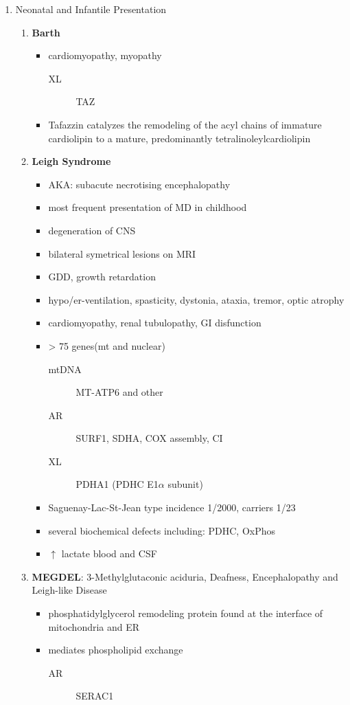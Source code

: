 \documentclass[12pt]{scrartcl}
\begin{document}
\begin{enumerate}
\item Neonatal and Infantile Presentation
\label{sec:orgd7a649c}
\begin{enumerate}
\item \textbf{Barth}
\label{sec:org1db8224}
\begin{itemize}
\item cardiomyopathy, myopathy
\begin{description}
\item[{XL}] TAZ
\end{description}
\item Tafazzin catalyzes the remodeling of the acyl chains of immature
cardiolipin to a mature, predominantly tetralinoleylcardiolipin
\end{itemize}
\item \textbf{Leigh Syndrome}
\label{sec:orgfb7a59c}
\begin{itemize}
\item AKA: subacute necrotising encephalopathy
\item most frequent presentation of MD in childhood
\item degeneration of CNS
\item bilateral symetrical lesions on MRI
\item GDD, growth retardation
\item hypo/er-ventilation, spasticity, dystonia, ataxia, tremor, optic atrophy
\item cardiomyopathy, renal tubulopathy, GI disfunction
\item \textgreater{} 75 genes(mt and nuclear)
\begin{description}
\item[{mtDNA}] MT-ATP6 and other
\item[{AR}] SURF1, SDHA, COX assembly, CI
\item[{XL}] PDHA1 (PDHC E1\(\alpha\) subunit)
\end{description}
\item Saguenay-Lac-St-Jean type incidence 1/2000, carriers 1/23
\item several biochemical defects including: PDHC, OxPhos
\item \(\uparrow\) lactate blood and CSF
\end{itemize}
\item \textbf{MEGDEL}: 3-Methylglutaconic aciduria, Deafness, Encephalopathy and Leigh-like Disease
\label{sec:org391eb2f}
\begin{itemize}
\item phosphatidylglycerol remodeling protein found at the interface of
mitochondria and ER
\item mediates phospholipid exchange
\begin{description}
\item[{AR}] SERAC1
\end{description}
\end{itemize}


\end{enumerate}
\end{enumerate}
\end{document}
